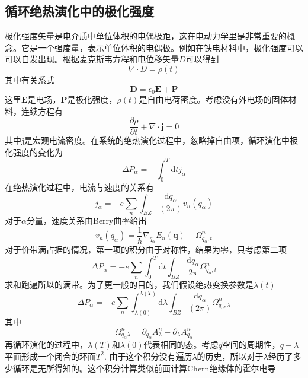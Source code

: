\documentclass{article}
\numberwithin{equation}{subsection}
\begin{document}
\subsection{循环绝热演化中的极化强度}
极化强度矢量是电介质中单位体积的电偶极距，这在电动力学里是非常重要的概念。它是一个强度量，表示单位体积的电偶极。例如在铁电材料中，极化强度可以可以自发出现。根据麦克斯韦方程和电位移矢量$D$可以得到
\begin{equation}
    \nabla\cdot D=\rho(t)
\end{equation}
其中有关系式
\begin{equation}
    \mathbf{D}=\epsilon_0\mathbf{E}+\mathbf{P}
\end{equation}
这里$\mathbf{E}$是电场，$\mathbf{P}$是极化强度，$\rho(t)$是自由电荷密度。考虑没有外电场的固体材料，连续方程有
\begin{equation}
    \frac{\partial\rho}{\partial t}+\nabla\cdot \mathbf{j}=0
\end{equation}
其中$\mathbf{j}$是宏观电流密度。在系统的绝热演化过程中，忽略掉自由项，循环演化中极化强度的变化为
\begin{equation}
    \Delta P_\alpha=-\int_0^T\mathrm{d}t j_\alpha
\end{equation}
在绝热演化过程中，电流与速度的关系有
\begin{equation}
    j_\alpha=-e\sum_{n}\int_{BZ}\frac{\mathrm{d}q_\alpha}{(2\pi)}v_n(q_\alpha)
\end{equation}
对于$\alpha$分量，速度关系由Berry曲率给出
\begin{equation}
    v_n(q_\alpha)=\frac{1}{\hbar}\nabla_{q_\alpha}E_n(\mathbf{q})-\Omega_{q_\alpha,t}^n
\end{equation}
对于价带满占据的情况，第一项的积分由于对称性，结果为零，只考虑第二项
\begin{equation}
    \Delta P_\alpha=-e\sum_n\int_0^T\mathrm{d}t\int_{BZ}\frac{\mathrm{d}q_\alpha}{2\pi}\Omega_{q_\alpha,t}^n
\end{equation}
求和跑遍所以的满带。为了更一般的目的，我们假设绝热变换参数是$\lambda(t)$
\begin{equation}
    \Delta P_\alpha=-e\sum_n\int_{\lambda(0)}^{\lambda(T)}\mathrm{d}\lambda\int_{BZ}\frac{\mathrm{d}q_\alpha}{(2\pi)}\Omega^{n}_{q_\alpha,\lambda}
\end{equation}
其中
\begin{equation}
    \Omega_{q_\alpha\lambda}^n=\partial_{q_\alpha}A_{\lambda}^n-\partial_{\lambda}A_{q_\alpha}^n
\end{equation}
再循环演化的过程中，$\lambda(T)$和$\lambda(0)$代表相同的态。考虑$q$空间的周期性，$q-\lambda$平面形成一个闭合的环面$T^2$. 由于这个积分没有遍历$\lambda$的历史，所以对于$\lambda$经历了多少循环是无所得知的。这个积分计算类似前面计算Chern绝缘体的霍尔电导
\end{document}
